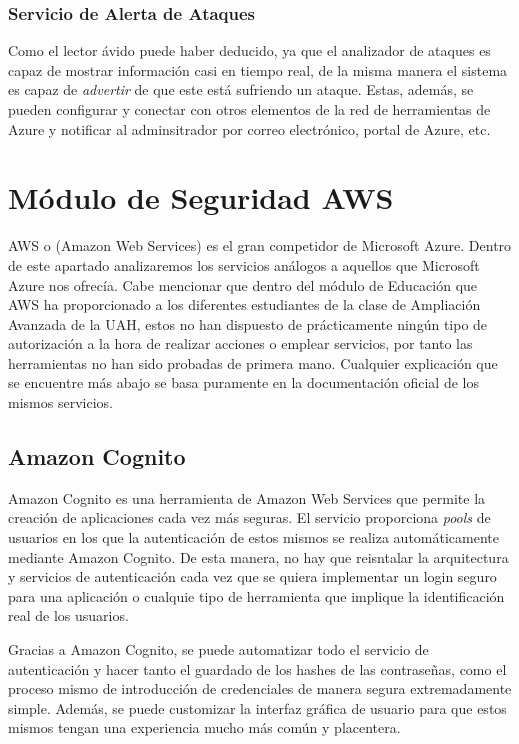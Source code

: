 \documentclass[english,runningheads,a4paper]{llncs}[2018/03/10]
\begin{document}
\subsubsection*{Servicio de Alerta de Ataques}
Como el lector ávido puede haber deducido, ya que el analizador de ataques es
capaz de mostrar información casi en tiempo real, de la misma manera el sistema
es capaz de \textit{advertir} de que este está sufriendo un ataque. Estas,
además, se pueden configurar y conectar con otros elementos de la red de
herramientas de Azure y notificar al adminsitrador por correo electrónico,
portal de Azure, etc.\

\section*{Módulo de Seguridad AWS}

AWS o (Amazon Web Services) es el gran competidor de Microsoft Azure. Dentro de
este apartado analizaremos los servicios análogos a aquellos que Microsoft Azure
nos ofrecía. Cabe mencionar que dentro del módulo de Educación que AWS ha
proporcionado a los diferentes estudiantes de la clase de Ampliación Avanzada de
la UAH, estos no han dispuesto de prácticamente ningún tipo de autorización a la
hora de realizar acciones o emplear servicios, por tanto las herramientas no han
sido probadas de primera mano. Cualquier explicación que se encuentre más abajo
se basa puramente en la documentación oficial de los mismos servicios.

\subsection*{Amazon Cognito}
Amazon Cognito es una herramienta de Amazon Web Services que permite la creación
de aplicaciones cada vez más seguras. El servicio proporciona \textit{pools} de
usuarios en los que la autenticación de estos mismos se realiza automáticamente
mediante Amazon Cognito. De esta manera, no hay que reisntalar la arquitectura y
servicios de autenticación cada vez que se quiera implementar un login seguro
para una aplicación o cualquie tipo de herramienta que implique la
identificación real de los usuarios. 

Gracias a Amazon Cognito, se puede automatizar todo el servicio de
autenticación y hacer tanto el guardado de los hashes de las contraseñas, como
el proceso mismo de introducción de credenciales de manera segura extremadamente
simple. Además, se puede customizar la interfaz gráfica de usuario para que
estos mismos tengan una experiencia mucho más común y placentera. 
\end{document}

